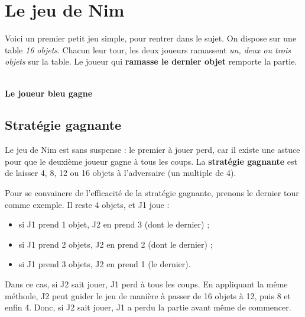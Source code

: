 \chapter*{Le jeu de Nim}

Voici un premier petit jeu simple, pour rentrer dans le sujet. On dispose sur
une table \textit{16 objets}. Chacun leur tour, les deux joueurs ramassent
\textit{un, deux ou trois objets} sur la table. Le joueur qui \textbf{ramasse le
  dernier objet} remporte la partie.

\bigskip
 

\bigskip
\bigskip
\bigskip

\begin{center}
 \\
\textbf{Le joueur bleu gagne}
\end{center}

\newpage

\section*{Stratégie gagnante}

Le jeu de Nim est sans suspense : le premier à jouer perd, car il existe une
astuce pour que le deuxième joueur gagne à tous les coups. La \textbf{stratégie
  gagnante} est de laisser 4, 8, 12 ou 16 objets à l'adversaire (un multiple de
4).

Pour se convaincre de l'efficacité de la stratégie gagnante, prenons le dernier
tour comme exemple. Il reste 4 objets, et J1 joue :

\begin{itemize}
  \item si J1 prend 1 objet, J2 en prend 3 (dont le dernier) ;
  \item si J1 prend 2 objets, J2 en prend 2 (dont le dernier) ;
  \item si J1 prend 3 objets, J2 en prend 1 (le dernier).
\end{itemize}        

Dans ce cas, si J2 sait jouer, J1 perd à tous les coups. En appliquant la même
méthode, J2 peut guider le jeu de manière à passer de 16 objets à 12, puis 8 et
enfin 4. Donc, si J2 sait jouer, J1 a perdu la partie avant même de commencer.

